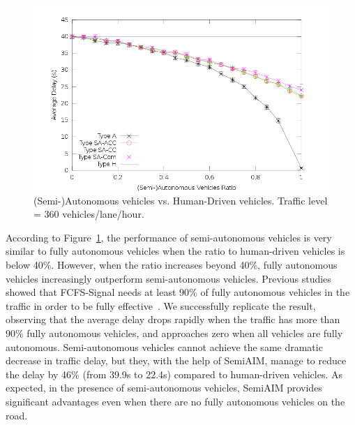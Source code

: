 


\begin{figure}
\centering
\includegraphics[width=0.9\columnwidth]{figures/figure_1.png}
\caption{(Semi-)Autonomous vehicles vs. Human-Driven vehicles. Traffic
level = 360 vehicles/lane/hour.}
\label{fig:two360}
\vspace{-.2in}
\end{figure}

According to Figure~\ref{fig:two360}, the performance of
semi-autonomous vehicles is very similar to fully autonomous vehicles
when the ratio to human-driven vehicles is below 40\%.  However, when
the ratio increases beyond 40\%, fully autonomous vehicles
increasingly outperform semi-autonomous vehicles.  Previous studies
showed that FCFS-Signal needs at least 90\% of fully autonomous
vehicles in the traffic in order to be fully
effective~\cite{bib:Dresner07Sharing}.  We successfully replicate the
result, observing that the average delay drops rapidly when the
traffic has more than 90\% fully autonomous vehicles, and approaches
zero when all vehicles are fully autonomous.  Semi-autonomous vehicles
cannot achieve the same dramatic decrease in traffic delay, but they,
with the help of SemiAIM, manage to reduce the delay by 46\% (from
39.9s to 22.4s) compared to human-driven vehicles.  As expected, in
the presence of semi-autonomous vehicles, SemiAIM provides significant
advantages even when there are no fully autonomous vehicles on the
road.

